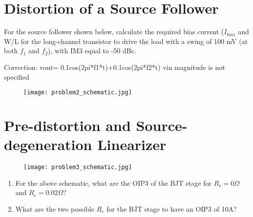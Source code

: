 \section{Distortion of a Source Follower}
{\color{blue} For the source follower shown below, calculate the required bias current ($I_{bias}$ and W/L for the long-channel transistor to drive the load with a swing of 100 mV (at both $f_1$ and $f_2$), with IM3 equal to -50 dBc.}

{\color{red} Correction: vout= 0.1cos(2pi*f1*t)+0.1cos(2pi*f2*t) vin magnitude is not specified}

\begin{figure}[H]
    \centering \texttt{[image: problem2\_schematic.jpg]}
\end{figure}

\section{Pre-distortion and Source-degeneration Linearizer}
\begin{figure}[H]
    \centering \texttt{[image: problem3\_schematic.jpg]}
\end{figure}

\begin{enumerate}[label=(\alph*)]
    \item {\color{blue} For the above schematic, what are the OIP3 of the BJT stage for $R_e = 0 \Omega$ and $R_e = 0.02 \Omega$?}

    \item {\color{blue} What are the two possible $R_e$ for the BJT stage to have an OIP3 of 10A?}
\end{enumerate}


